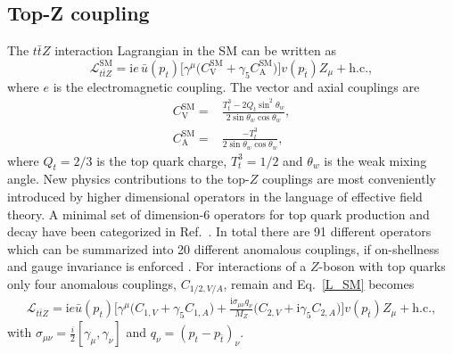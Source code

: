 \documentclass[preprint]{JHEP3} %
\newcommand{\mrm}{\mathrm}
\def\ttbZ{t\bar{t}Z}
\def\sw{\sin \theta_w}
\def\swsq{\sin^2 \theta_w}
\def\cw{\cos \theta_w}
\def\ConeVSM{C_\mathrm{V}^{\mrm{SM}}}
\def\ConeASM{C_\mathrm{A}^{\mrm{SM}}}
\newcommand{\be}{\begin{eqnarray}}
\newcommand{\ee}{\end{eqnarray}}
\begin{document}
\subsection{Top-Z coupling}
The $\ttbZ$ interaction Lagrangian in the SM can be written as
\begin{equation} \label{L_SM}
\mathcal{L}_{\ttbZ}^{\mrm{SM}} = \mathrm{i} e \, \bar{u}(p_t)\biggl[ \gamma^{\mu} \bigl( \ConeVSM + \gamma_5 \ConeASM \bigr) \biggr]v(p_{\bar{t}}) Z_{\mu}
+ \mathrm{h.c.}
,
\end{equation}
where $e$ is the electromagnetic coupling. The vector and axial couplings are 
\begin{equation}
\begin{split}
\ConeVSM =& \frac{T^3_t - 2Q_t \swsq}{2\sw \cw}, \\
\ConeASM =& \frac{-T^3_t}{2 \sw \cw},  
\end{split}
\end{equation}
where $Q_t = 2/3$ is the top quark charge, $T^3_t=1/2$ and $\theta_w$ is the weak mixing angle. 
New physics contributions to the top-$Z$ couplings are most conveniently introduced by higher dimensional operators 
in the language of effective field theory. 
A minimal set of dimension-6 operators for top quark production and decay have been categorized in Ref.~\cite{AlcarazMaestre:2012vp,0811.3842,Willenbrock?}.
In total there are 91 different operators which can be summarized into 20 different anomalous couplings, if on-shellness and gauge invariance is enforced \cite{0811.3842}. 
For interactions of a $Z$-boson with top quarks only four anomalous couplings, $C_{1/2,V/A}$, remain and Eq.~\ref{L_SM} becomes
\be
\label{L_NP}
\mathcal{L}_{\ttbZ} = \mathrm{i} e \bar{u}(p_t)\biggl[ \gamma^{\mu} \bigl(C_{1,V} + \gamma_5 C_{1,A} \bigr)
 + \frac{\mathrm{i} \sigma_{\mu \nu} q_{\nu}}{M_Z} 
\bigl(C_{2,V} + \mathrm{i} \gamma_5 C_{2,A} \bigr) \biggr] v(p_{\bar{t}}) Z_{\mu} + \mathrm{h.c.}, 
\ee
with $\sigma_{\mu \nu}=\frac{i}{2} [ \gamma_{\mu},\gamma_{\nu} ]$ and $q_{\nu} = (p_{t}-p_{\bar{t}})_{\nu}$.
\end{document}
